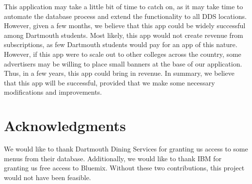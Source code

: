 \documentclass [12pt] {article}
\begin{document}
This application may take a little bit of time to catch on, as it may take time to automate the database process and extend the functionality to all DDS locations. However, given a few months, we believe that this app could be widely successful among Dartmouth students. Most likely, this app would not create revenue from subscriptions, as few Dartmouth students would pay for an app of this nature. However, if this app were to scale out to other colleges across the country, some advertisers may be willing to place small banners at the base of our application. Thus, in a few years, this app could bring in revenue. In summary, we believe that this app will be successful, provided that we make some necessary modifications and improvements.

\section{Acknowledgments}

We would like to thank Dartmouth Dining Services for granting us access to some menus from their database. Additionally, we would like to thank IBM for granting us free access to Bluemix. Without these two contributions, this project would not have been feasible.
\end{document}

